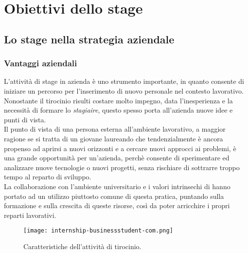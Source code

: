 \newpage
\chapter{Obiettivi dello stage}
\label{cap:obiettivi-stage}
\section{Lo stage nella strategia aziendale}
\subsection{Vantaggi aziendali}
L'attività di stage in azienda è uno strumento importante, in quanto consente di iniziare un percorso per l'inserimento di nuovo personale nel contesto lavorativo.\\
Nonostante il tirocinio risulti costare molto impegno, data l'inesperienza e la necessità di formare lo \textit{stagiaire}, questo spesso porta all'azienda nuove idee e punti di vista.\\
Il punto di vista di una persona esterna all'ambiente lavorativo, a maggior ragione se si tratta di un giovane laureando che tendenzialmente è ancora propenso ad aprirsi a nuovi orizzonti e a cercare nuovi approcci ai problemi, è una grande opportunità per un'azienda, perchè consente di sperimentare ed analizzare nuove tecnologie o nuovi progetti, senza rischiare di sottrarre troppo tempo al reparto di sviluppo.\\
La collaborazione con l'ambiente universitario e i valori intrinsechi di \AD{} hanno portato ad un utilizzo piuttosto comune di questa pratica, puntando sulla formazione e sulla crescita di queste risorse, così da poter arricchire i propri reparti lavorativi.

\begin{figure}[h]
\texttt{[image: internship-businessstudent-com.png]}
\centering
\caption{Caratteristiche dell'attività di tirocinio.} 
\label{fig:internship}
\end{figure}


